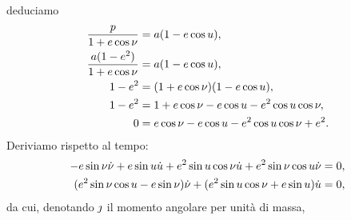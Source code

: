 deduciamo
\begin{align*}
  \frac{p}{1 + e \cos{\nu}}
    &= a(1 - e \cos{u}),\\
  \frac{a(1 - e^2)}
    {1 + e \cos{\nu}}
    &= a(1 - e \cos{u}),\\
  1 - e^2
    &= (1 + e \cos{\nu})
    (1 - e\cos{u}),\\
  1 - e^2
    &= 1 + e \cos{\nu}
    - e \cos{u}
    - e^2 \cos{u} \cos{\nu},\\
  0 &= e \cos{\nu}
  - e \cos{u}
  - e^2 \cos{u} \cos{\nu}
  + e^2.
\end{align*}
Deriviamo rispetto al tempo:
\begin{align*}
  - e \sin{\nu} \dot{\nu}
    + e \sin{u} \dot{u}
    + e^2 \sin{u} \cos{\nu}
      \dot{u}
    + e^2 \sin{\nu} \cos{u}
      \dot{\nu}
    &= 0,\\
  (e^2 \sin{\nu} \cos{u}
    - e \sin{\nu}) \dot{\nu}
    + (e^2 \sin{u} \cos{\nu}
    + e \sin{u}) \dot{u}
    &= 0,
\end{align*}
da cui, denotando $\jmath$ il momento angolare per
unit\`a di massa,
